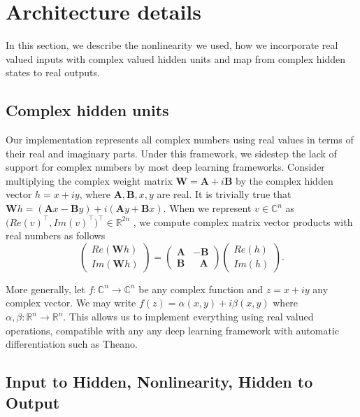 \documentclass{article} %
\newcommand{\matr}[1]{\mathbf{#1}}
\newcommand\RR{\mathbb{R}}
\newcommand\CC{\mathbb{C}}
\begin{document}
\section{Architecture details}
\label{sec:impl}
\vspace{-0.1mm}
In this section, we describe the nonlinearity we used, how we incorporate real valued inputs 
with complex valued hidden units and map from complex hidden states to real outputs. 
\vspace{-0.1mm}
\subsection{Complex hidden units}
\vspace{-0.1mm}
Our implementation represents all complex numbers using real values in terms of their
real and imaginary parts. Under this framework, we sidestep the lack of support for complex numbers 
by most deep learning frameworks. Consider multiplying the complex weight matrix 
$\matr{W} = \matr{A} + i \matr{B}$ by the complex hidden vector $h = x + i y$, where
$\matr{A}, \matr{B}, x, y$ are real.
It is trivially true that $\matr{W}h = (\matr{A}x - \matr{B}y) + i (\matr{A}y + \matr{B}x)$.
When we represent $v \in \CC^n$ as $\big(Re(v)^\top, Im(v)^\top \big)^\top \in \RR^{2n}$ , we
compute complex matrix vector products with real numbers as follows
\vspace{-0.2mm}
\begin{equation} \begin{pmatrix} Re(\matr{W}h) \\ Im(\matr{W}h) \end{pmatrix}  
= \begin{pmatrix} \matr{A} & -\matr{B} \\ \matr{B} & \ \ \ 
\matr{A} \end{pmatrix} \begin{pmatrix} Re(h) \\ Im(h) \end{pmatrix} .
\end{equation}

More generally, let $f: \CC^n \rightarrow \CC^n$ be any complex function and $z = x + i y$ 
any complex vector. We may write $ f(z) = \alpha(x, y) + i \beta(x, y) $ where 
$\alpha, \beta : \RR^n \rightarrow \RR^n$. 
This allows us to implement everything using real valued operations, compatible with any
any deep learning framework with automatic differentiation such as Theano.

\subsection{Input to Hidden, Nonlinearity, Hidden to Output}
\end{document}
